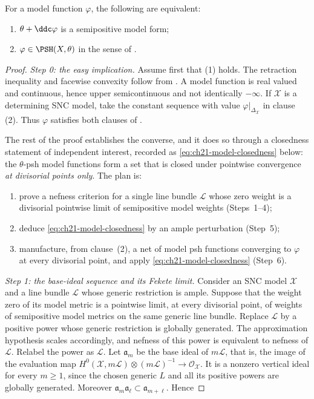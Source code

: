 \begin{theorem}\label{thm:ch21-model-consistency}
For a model function $\varphi$, the following are equivalent:

\begin{enumerate}
\item $\theta+\ddc\varphi$ is a semipositive model form;
\item $\varphi\in\PSH(X,\theta)$ in the sense of
.
\end{enumerate}
\end{theorem}

\begin{proof}
\emph{Step 0: the easy implication.}
Assume first that (1) holds.  The retraction inequality and facewise
convexity follow from .  A model
function is real valued and continuous, hence upper semicontinuous and not
identically $-\infty$.  If
$\mathcal X$ is a determining SNC model, take the constant sequence with
value $\varphi|_{\Delta_{\mathcal X}}$ in clause (2).  Thus
$\varphi$ satisfies both clauses of .

The rest of the proof establishes the converse, and it does so through a
closedness statement of independent interest, recorded as
\eqref{eq:ch21-model-closedness} below: the $\theta$-psh model functions
form a set that is closed under pointwise convergence \emph{at divisorial
points only}.  The plan is:
\begin{enumerate}
\item[(a)] prove a nefness criterion for a single line bundle
$\mathcal L$ whose zero weight is a divisorial pointwise limit of
semipositive model weights (Steps~1--4);
\item[(b)] deduce \eqref{eq:ch21-model-closedness} by an ample perturbation
(Step~5);
\item[(c)] manufacture, from clause~(2), a net of model psh functions
converging to $\varphi$ at every divisorial point, and apply
\eqref{eq:ch21-model-closedness} (Step~6).
\end{enumerate}

\emph{Step 1: the base-ideal sequence and its Fekete limit.}
Consider
an SNC model $\mathcal X$ and a line bundle $\mathcal L$ whose generic
restriction is ample.  Suppose that the weight zero of its model metric is a
pointwise limit, at every divisorial point, of weights of semipositive model
metrics on the same generic line bundle.  Replace $\mathcal L$ by a
positive power whose generic restriction is globally generated.  The
approximation hypothesis scales accordingly, and nefness of this power is
equivalent to nefness of $\mathcal L$.  Relabel the power as $\mathcal L$.
Let $\mathfrak a_m$ be the base
ideal of $m\mathcal L$, that is, the image of the evaluation map
$H^0(\mathcal X,m\mathcal L)\otimes(m\mathcal L)^{-1}\to
\mathcal O_{\mathcal X}$.  It is a nonzero vertical ideal for every $m\geq1$, since the chosen
generic $L$ and all its positive powers are globally generated.  Moreover
$\mathfrak a_m\mathfrak a_\ell\subset\mathfrak a_{m+\ell}$.  Hence


\end{proof}
